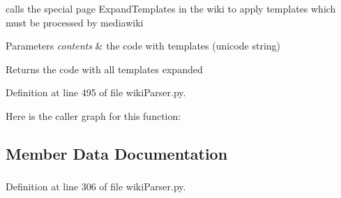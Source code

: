 calls the special page \-Expand\-Templates in the wiki to apply templates which must be processed by mediawiki 


\begin{DoxyParams}{\-Parameters}
{\em contents} & the code with templates (unicode string) \\
\hline
\end{DoxyParams}
\begin{DoxyReturn}{\-Returns}
the code with all templates expanded 
\end{DoxyReturn}


\-Definition at line 495 of file wiki\-Parser.\-py.



\-Here is the caller graph for this function\-:




\subsection{\-Member \-Data \-Documentation}
\hypertarget{classuicilibris_1_1wikiParser_1_1wikiParser_ab7f4d7c5562ce8d2649a9215aca2c351}{
\subsubsection[{base\-Address}]{}}\label{classuicilibris_1_1wikiParser_1_1wikiParser_ab7f4d7c5562ce8d2649a9215aca2c351}


\-Definition at line 306 of file wiki\-Parser.\-py.

\hypertarget{classuicilibris_1_1wikiParser_1_1wikiParser_a82888a48bdef33d5201bdb74ba1a8bd0}{
\subsubsection[{cache}]{}}\label{classuicilibris_1_1wikiParser_1_1wikiParser_a82888a48bdef33d5201bdb74ba1a8bd0}


